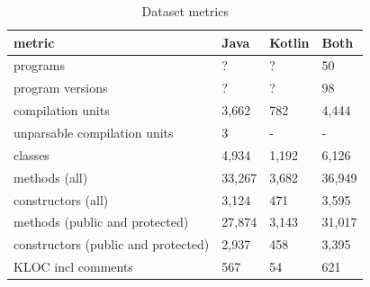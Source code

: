 \begin{table}[]
\centering
\caption{Dataset metrics }
\label{tab:data-metrics}
\begin{tabular}{|l|l|l|l|} \hline
metric & Java & Kotlin & Both \\ \hline
programs & ? & ? &50  \\
program versions & ? & ? &98  \\
compilation units & 3,662 & 782 & 4,444 \\
unparsable compilation units & 3 & - & - \\
\hline
classes & 4,934 & 1,192 & 6,126 \\
methods (all) & 33,267 & 3,682 & 36,949 \\
constructors (all) & 3,124 & 471 & 3,595 \\
methods (public and protected) & 27,874 & 3,143 & 31,017 \\
constructors (public and protected) & 2,937 & 458 & 3,395 \\
KLOC incl comments & 567 & 54 & 621 \\
\hline
\end{tabular}
\end{table}
